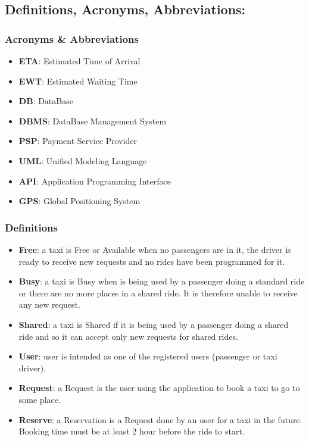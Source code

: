 \documentclass{article}
\begin{document}
\subsection{Definitions, Acronyms, Abbreviations: }

\subsubsection{Acronyms \& Abbreviations}
\begin{itemize}
\item \textbf{ETA}: Estimated Time of Arrival
\item \textbf{EWT}: Estimated Waiting Time
\item \textbf{DB}: DataBase
\item \textbf{DBMS}: DataBase Management System
\item \textbf{PSP}: Payment Service Provider
\item \textbf{UML}: Unified Modeling Language
\item \textbf{API}: Application Programming Interface
\item \textbf{GPS}: Global Positioning System
\end{itemize}

\subsubsection{Definitions}
\begin{itemize}
\item \textbf{Free}: a taxi is Free or Available when no passengers are in it, the driver is ready to receive new requests and no rides have been programmed for it.
\item \textbf{Busy}: a taxi is Busy when is being used by a passenger doing a standard ride or there are no more places in a shared ride. It is therefore unable to receive any new request.
\item \textbf{Shared}: a taxi is Shared if it is being used by a passenger doing a shared ride and so it can accept only new requests for shared rides.
\item \textbf{User}: user is intended as one of the registered users (passenger or taxi driver).
\item \textbf{Request}: a Request is the user using the application to book a taxi to go to some place.
\item \textbf{Reserve}: a Reservation is a Request done by an user for a taxi in the future. Booking time must be at least 2 hour before the ride to start.
\end{itemize}
\end{document}
